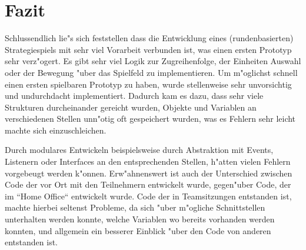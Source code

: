 \chapter{Fazit}
Schlussendlich lie"s sich feststellen dass die Entwicklung eines (rundenbasierten) Strategiespiels mit sehr viel Vorarbeit verbunden ist, was einen ersten Prototyp sehr verz"ogert. Es gibt sehr viel Logik zur Zugreihenfolge, der Einheiten Auswahl oder der Bewegung "uber das Spielfeld zu implementieren. Um m"oglichst schnell einen ersten spielbaren Prototyp zu haben, wurde stellenweise sehr unvorsichtig und undurchdacht implementiert. Dadurch kam es dazu, dass sehr viele Strukturen durcheinander gereicht wurden, Objekte und Variablen an verschiedenen Stellen unn"otig oft gespeichert wurden, was es Fehlern sehr leicht machte sich einzuschleichen.\newline

Durch modulares Entwickeln beispielsweise durch Abstraktion mit Events, Listenern oder Interfaces an den entsprechenden Stellen, h"atten vielen Fehlern vorgebeugt werden k"onnen. Erw"ahnenswert ist auch der Unterschied zwischen Code der vor Ort mit den Teilnehmern entwickelt wurde, gegen"uber Code, der im ``Home Office`` entwickelt wurde. Code der in Teamsitzungen entstanden ist, machte hierbei seltenst Probleme, da sich "uber m"ogliche Schnittstellen unterhalten werden konnte, welche Variablen wo bereits vorhanden werden konnten, und allgemein ein besserer Einblick "uber den Code von anderen entstanden ist.